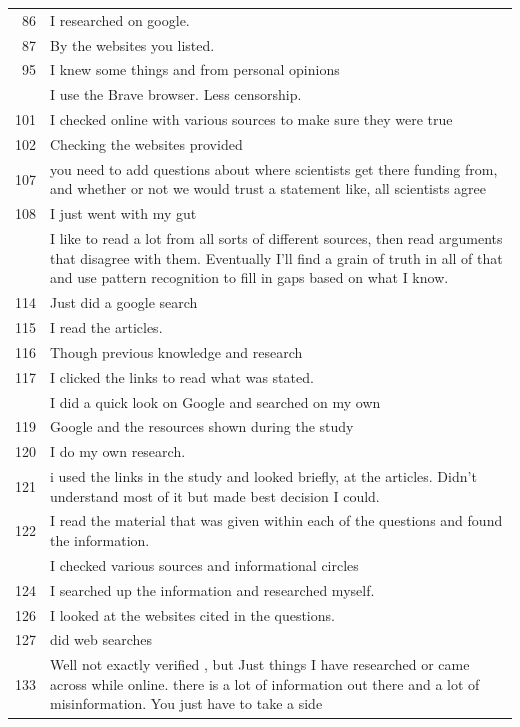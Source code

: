 \documentclass[
  doc,floatsintext]{apa6}
\begin{document}
\begin{longtable}[t]{>{}r>{\raggedright\arraybackslash}p{30em}}
86 & I researched on google.\\
87 & By the websites you listed.\\
95 & I knew some things and from personal opinions\\
\addlinespace
98 & I use the Brave browser. Less censorship.\\
101 & I checked online with various sources to make sure they were true\\
102 & Checking the websites provided\\
107 & you need to add questions about where scientists get there funding from, and whether or not we would trust a statement like, all scientists agree\\
108 & I just went with my gut\\
\addlinespace
111 & I like to read a lot from all sorts of different sources, then read arguments that disagree with them. Eventually I'll find a grain of truth in all of that and use pattern recognition to fill in gaps based on what I know.\\
114 & Just did a google search\\
115 & I read the articles.\\
116 & Though previous knowledge and research\\
117 & I clicked the links to read what was stated.\\
\addlinespace
118 & I did a quick look on Google and searched on my own\\
119 & Google and the resources shown during the study\\
120 & I do my own research.\\
121 & i used the links in the study and looked briefly, at the articles.  Didn't understand most of it but made best decision I could.\\
122 & I read the material that was given within each of the questions and found the information.\\
\addlinespace
123 & I checked various sources and informational circles\\
124 & I searched up the information and researched myself.\\
126 & I looked at the websites cited in the questions.\\
127 & did web searches\\
133 & Well not exactly verified , but Just things I have researched or came across while online. there is a lot of information out there and a lot of misinformation. You just have to take a side\\

\end{longtable}
\end{document}
